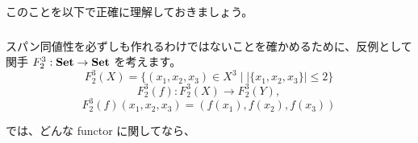 \documentclass[
		head_space=20mm,
		foot_space=20mm,
		gutter=10mm,
		line_length=190mm
]{jlreq}
\begin{document}

\noindent このことを以下で正確に理解しておきましょう。

\clearpage

\subsubsection*{}

\noindent 
スパン同値性を必ずしも作れるわけではないことを確かめるために、反例として関手 $F^3_2:\mathbf{Set}\to\mathbf{Set}$ を考えます。
\[F^3_2(X)=\{(x_1,x_2,x_3)\in X^3\mid|\{x_1,x_2,x_3\}|\leq 2\}\] 
\[F^3_2(f):F^3_2(X)\to F^3_2(Y),\]\[F^3_2(f)(x_1,x_2,x_3)=(f(x_1),f(x_2),f(x_3))\]


\noindent では、どんな functor に関してなら、

\begin{definition}
	
\end{definition}

\begin{proposition}
	
\end{proposition}
\end{document}
